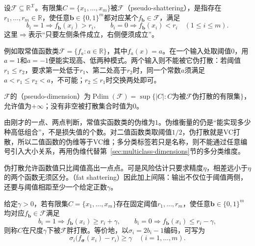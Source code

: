 \begin{definition}[伪打散]
\label{def:pseudo-shattering}
设$\mathcal F\subseteq\mathbb R^{\mathcal X}$。有限集$C=\{x_1,\ldots,x_m\}$被$\mathcal F$（pseudo-shattering），是指存在$r_1,\ldots,r_m\in\mathbb R$，使任意$\bm b\in\{0,1\}^m$都对应某个$f_{\bm b}\in\mathcal F$，满足
\[
 b_i=1\Rightarrow f_{\bm b}(x_i)>r_i,\qquad
 b_i=0\Rightarrow f_{\bm b}(x_i)<r_i\quad(1\leq i\leq m).
\]
这里$\Rightarrow$表示“只要左侧条件成立，右侧便须成立”。
\end{definition}

例如取常值函数类$\mathcal F=\{f_a:a\in\mathbb R\}$，其中$f_a(x)=a$。在一个输入处取阈值$0$，用$a=1$和$a=-1$便能实现高、低两种模式。两个输入则不能被它伪打散：若阈值$r_1\leq r_2$，要求第一处低于$r_1$、第二处高于$r_2$时，同一个常数$a$须满足$a<r_1\leq r_2<a$，不可能；$r_2\leq r_1$时交换两处即可。

\begin{definition}[伪维]
\label{def:pseudo-dimension}
$\mathcal F$的（pseudo-dimension）为$\operatorname{Pdim}(\mathcal F)=\sup\{|C|:C\text{为被}\mathcal F\text{伪打散的有限集}\}$，允许值为$+\infty$；没有非空被打散集合时值为$0$。
\end{definition}

由刚才的一点、两点判断，常值实函数类的伪维为$1$。伪维衡量的仍是“能实现多少种高低组合”，不是损失值的个数。对二值函数类取阈值$1/2$，伪打散就是VC打散，所以二值函数的伪维等于VC维；多分类标签若只是名称，则不能通过任意编号引入大小关系，再用伪维代替第~\ref{sec:multiclass-dimensions}节的多分类维度。

伪打散允许函数值只比阈值高出一点点。可是风险估计只要求精度$\eta$，相差远小于$\eta$的两个函数无须区分。（fat shattering）因此加上间隔：输出不仅位于阈值两侧，还要与阈值相距至少一个给定正数$\gamma$。

\begin{definition}[胖打散]
\label{def:fat-shattering}
给定$\gamma>0$，若有限集$C=\{x_1,\ldots,x_m\}$存在固定阈值$r_1,\ldots,r_m$，使任意$\bm b\in\{0,1\}^m$均对应$f_{\bm b}\in\mathcal F$满足
\begin{equation}
 b_i=1\Rightarrow f_{\bm b}(x_i)\geq r_i+\gamma,\qquad
 b_i=0\Rightarrow f_{\bm b}(x_i)\leq r_i-\gamma,
 \label{eq:fat-shattering}
\end{equation}
则称$C$在尺度$\gamma$下被$\mathcal F$胖打散。等价地，以$\sigma_i=2b_i-1$编码，可写为
\begin{equation}
 \sigma_i\bigl(f_{\bm\sigma}(x_i)-r_i\bigr)\geq\gamma
 \quad(i=1,\ldots,m).
 \label{eq:functional-fat-shattering}
\end{equation}
\end{definition}

